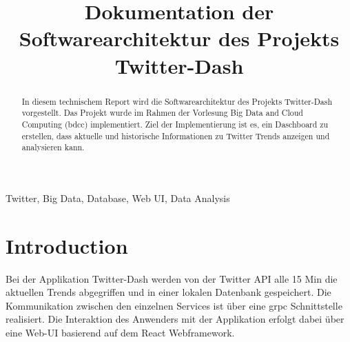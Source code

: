 \documentclass[conference]{IEEEtran}
\begin{document}
\title{Dokumentation der Softwarearchitektur des Projekts Twitter-Dash}

\author{
        \and

        \and

        \and

        \and

        \and

}

\maketitle

\begin{abstract}
In diesem technischem Report wird die Softwarearchitektur des Projekts 
Twitter-Dash vorgestellt. Das Projekt wurde im Rahmen der Vorlesung 
Big Data and Cloud Computing (bdcc) implementiert. Ziel der Implementierung ist es, 
ein Daschboard zu erstellen, dass aktuelle und historische Informationen zu Twitter Trends
anzeigen und analysieren kann.
\end{abstract}

\begin{IEEEkeywords}
 Twitter, Big Data, Database, Web UI, Data Analysis
\end{IEEEkeywords}

\section{Introduction}
Bei der Applikation Twitter-Dash werden von der Twitter API alle 15 Min die aktuellen Trends
abgegriffen und in einer lokalen Datenbank gespeichert. Die Kommunikation zwischen den 
einzelnen Services ist über eine grpc Schnittstelle realisiert. Die Interaktion des Anwenders mit der Applikation erfolgt dabei über eine Web-UI basierend auf dem 
React Webframework.
\end{document}
